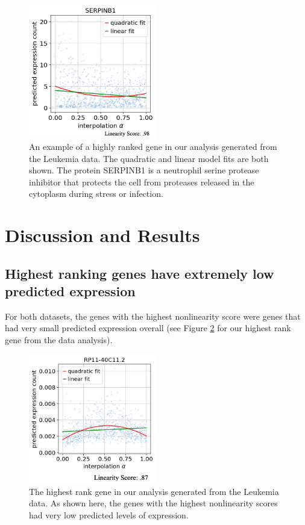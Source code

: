 \documentclass{article}
\begin{document}
\begin{figure}
  \centering
  \includegraphics[width=0.5\textwidth]{SERPINB1.jpg}
  \caption{An example of a highly ranked gene in our analysis generated from the \citet{ferrall-fairbanks_progenitor_2022} Leukemia data.
  The quadratic and linear model fits are both shown.
  The protein SERPINB1 is a neutrophil serine protease inhibitor that protects the cell from proteases released in the cytoplasm during stress or infection.}
  \label{SERPINB1_graph}
\end{figure}

\section{Discussion and Results}


\subsection{Highest ranking genes have extremely low predicted expression}
For both datasets, the genes with the highest nonlinearity score were genes that had very small predicted expression overall (see Figure \ref{RP_gene_plot} for our highest rank gene from the \citet{ferrall-fairbanks_progenitor_2022} data analysis).


\begin{figure}
  \centering
  \includegraphics[width=0.5\textwidth]{RP_gene_plot.jpg}
  \caption{The highest rank gene in our analysis generated from the \citet{ferrall-fairbanks_progenitor_2022} Leukemia data.
  As shown here, the genes with the highest nonlinearity scores had very low predicted levels of expression.}
  \label{RP_gene_plot}
\end{figure}
\end{document}
